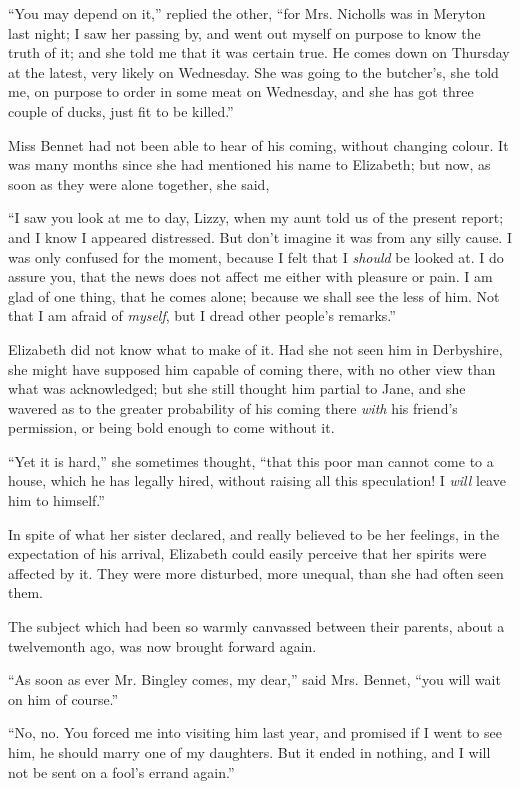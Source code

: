 “You may depend on it,” replied the other, “for
Mrs. Nich\-olls was in Meryton last night; I saw her
passing by, and went out myself on purpose to know the
truth of it; and she told me that it was certain true.
He comes down on Thursday at the latest, very likely
on Wednesday. She was going to the butcher’s, she told
me, on purpose to order in some meat on Wednesday, and
she has got three couple of ducks, just fit to be killed.”

Miss Bennet had not been able to hear of his coming,
without changing colour. It was many months since she
had mentioned his name to Elizabeth; but now, as soon
as they were alone together, she said,

“I saw you look at me to day, Lizzy, when my aunt
told us of the present report; and I know I appeared
distressed. But don’t imagine it was from any silly cause.
I was only confused for the moment, because I felt that
I \textit{should} be looked at. I do assure you, that the news does
not affect me either with pleasure or pain. I am glad
of one thing, that he comes alone; because we shall see
the less of him. Not that I am afraid of \textit{myself}, but I dread
other people’s remarks.”

Elizabeth did not know what to make of it. Had she
not seen him in Derbyshire, she might have supposed him
capable of coming there, with no other view than what
was acknowledged; but she still thought him partial to
Jane, and she wavered as to the greater probability of
his coming there \textit{with} his friend’s permission, or being bold
enough to come without it.

“Yet it is hard,” she sometimes thought, “that this
poor man cannot come to a house, which he has legally
hired, without raising all this speculation! I \textit{will} leave him
to himself.”

In spite of what her sister declared, and really believed
to be her feelings, in the expectation of his arrival, Elizabeth
could easily perceive that her spirits were affected
by it. They were more disturbed, more unequal, than she
had often seen them.

The subject which had been so warmly canvassed
between their parents, about a twelvemonth ago, was now
brought forward again.

“As soon as ever Mr. Bingley comes, my dear,” said
Mrs. Bennet, “you will wait on him of course.”

“No, no. You forced me into visiting him last year,
and promised if I went to see him, he should marry one
of my daughters. But it ended in nothing, and I will
not be sent on a fool’s errand again.”

